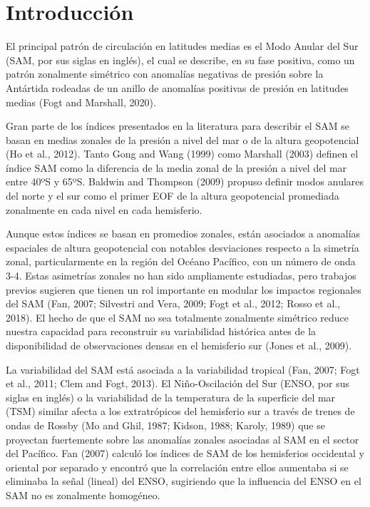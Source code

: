 \documentclass[12pt,oneside]{reedthesis}
\begin{document}
\hypertarget{intro}{%
\chapter{Introducción}\label{intro}}

El principal patrón de circulación en latitudes medias es el Modo Anular del Sur (SAM, por sus siglas en inglés), el cual se describe, en su fase positiva, como un patrón zonalmente simétrico con anomalías negativas de presión sobre la Antártida rodeadas de un anillo de anomalías positivas de presión en latitudes medias (Fogt and Marshall, 2020).

Gran parte de los índices presentados en la literatura para describir el SAM se basan en medias zonales de la presión a nivel del mar o de la altura geopotencial (Ho et al., 2012).
Tanto Gong and Wang (1999) como Marshall (2003) definen el índice SAM como la diferencia de la media zonal de la presión a nivel del mar entre 40ºS y 65ºS.
Baldwin and Thompson (2009) propuso definir modos anulares del norte y el sur como el primer EOF de la altura geopotencial promediada zonalmente en cada nivel en cada hemisferio.

Aunque estos índices se basan en promedios zonales, están asociados a anomalías espaciales de altura geopotencial con notables desviaciones respecto a la simetría zonal, particularmente en la región del Océano Pacífico, con un número de onda 3-4.
Estas asimetrías zonales no han sido ampliamente estudiadas, pero trabajos previos sugieren que tienen un rol importante en modular los impactos regionales del SAM (Fan, 2007; Silvestri and Vera, 2009; Fogt et al., 2012; Rosso et al., 2018).
El hecho de que el SAM no sea totalmente zonalmente simétrico reduce nuestra capacidad para reconstruir su variabilidad histórica antes de la disponibilidad de observaciones densas en el hemisferio sur (Jones et al., 2009).

La variabilidad del SAM está asociada a la variabilidad tropical (Fan, 2007; Fogt et al., 2011; Clem and Fogt, 2013).
El Niño-Oscilación del Sur (ENSO, por sus siglas en inglés) o la variabilidad de la temperatura de la superficie del mar (TSM) similar afecta a los extratrópicos del hemisferio sur a través de trenes de ondas de Rossby (Mo and Ghil, 1987; Kidson, 1988; Karoly, 1989) que se proyectan fuertemente sobre las anomalías zonales asociadas al SAM en el sector del Pacífico.
Fan (2007) calculó los índices de SAM de los hemisferios occidental y oriental por separado y encontró que la correlación entre ellos aumentaba si se eliminaba la señal (lineal) del ENSO, sugiriendo que la influencia del ENSO en el SAM no es zonalmente homogéneo.
\end{document}
